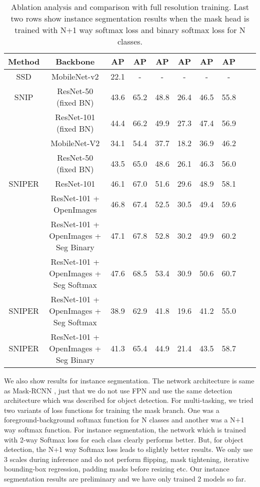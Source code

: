 \documentclass{article}
\begin{document}
\begin{table*}[t]
\begin{center}
\small

\begin{tabular}{|c|c|c|c|c|c|c|c|c|c|}
  \hline
  Method & Backbone & AP & AP & AP & AP & AP & AP \\
  \hline
  SSD   & MobileNet-v2 & 22.1 & - & - & - & - & - \\
  \hline
  SNIP   & ResNet-50 (fixed BN) & 43.6 & 65.2 & 48.8 & 26.4 & 46.5 & 55.8 \\
     & ResNet-101 (fixed BN) & 44.4 & 66.2 & 49.9 & 27.3 & 47.4 & 56.9 \\
  \hline
  \hline
  & MobileNet-V2 & 34.1 & 54.4 & 37.7 & 18.2 & 36.9 & 46.2 \\
  & ResNet-50 (fixed BN) & 43.5 & 65.0 & 48.6 & 26.1 & 46.3 & 56.0 \\
SNIPER   & ResNet-101 & 46.1 & 67.0 & 51.6 & 29.6 & 48.9 & 58.1 \\
   & ResNet-101 + OpenImages & 46.8 & 67.4 & 52.5 & 30.5 & 49.4 & 59.6 \\
   & ResNet-101 + OpenImages + Seg Binary & 47.1 & 67.8 & 52.8 & 30.2 & 49.9 & 60.2 \\   
   & ResNet-101 + OpenImages + Seg Softmax & 47.6 & 68.5 & 53.4 & 30.9 & 50.6 & 60.7 \\   
  \hline
  \hline
 SNIPER   & ResNet-101 + OpenImages + Seg Softmax & 38.9 & 62.9 & 41.8 & 19.6 & 41.2 & 55.0 \\ 
 SNIPER   & ResNet-101 + OpenImages + Seg Binary & 41.3 & 65.4 & 44.9 & 21.4 & 43.5 & 58.7 \\   
 \hline
 \end{tabular}
 \newline
 \caption{Ablation analysis and comparison with full resolution training. Last two rows show instance segmentation results when the mask head is trained with N+1 way softmax loss and binary softmax loss for N classes.}
\label{tab:final_bbox}
\end{center}
\end{table*}
We also show results for instance segmentation. The network architecture is same as Mask-RCNN \cite{he2017mask}, just that we do not use FPN \cite{lin2017feature} and use the same detection architecture which was described for object detection. For multi-tasking, we tried two variants of loss functions for training the mask branch. One was a foreground-background softmax function for N classes and another was a N+1 way softmax function. For instance segmentation, the network which is trained with 2-way Softmax loss for each class clearly performs better. But, for object detection, the N+1 way Softmax loss leads to slightly better results. We only use 3 scales during inference and do not perform flipping, mask tightening, iterative bounding-box regression, padding masks before resizing etc. Our instance segmentation results are preliminary and we have only trained 2 models so far.
\end{document}
